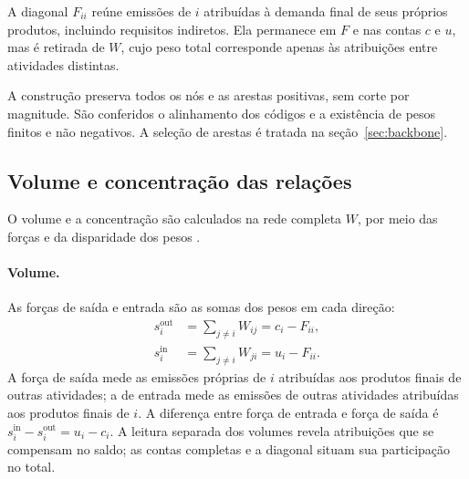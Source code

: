 \documentclass[12pt]{article}
\begin{document}
A diagonal $F_{ii}$ reúne emissões de $i$ atribuídas à demanda final de seus próprios produtos, incluindo requisitos indiretos. Ela permanece em $F$ e nas contas $c$ e $u$, mas é retirada de $W$, cujo peso total corresponde apenas às atribuições entre atividades distintas.

A construção preserva todos os nós e as arestas positivas, sem corte por magnitude. São conferidos o alinhamento dos códigos e a existência de pesos finitos e não negativos. A seleção de arestas é tratada na seção~\ref{sec:backbone}.

\subsection{Volume e concentração das relações}
\label{sec:volume-concentracao}

O volume e a concentração são calculados na rede completa $W$, por meio das forças e da disparidade dos pesos \parencite{huang2019,serrano2009}.

\paragraph{Volume.}
As forças de saída e entrada são as somas dos pesos em cada direção:
\begin{equation}
\begin{aligned}
s_i^{\mathrm{out}}&=\sum_{j\ne i}W_{ij}=c_i-F_{ii},\\
s_i^{\mathrm{in}}&=\sum_{j\ne i}W_{ji}=u_i-F_{ii}.
\end{aligned}
\label{eq:forcas-externas}
\end{equation}
A força de saída mede as emissões próprias de $i$ atribuídas aos produtos finais de outras atividades; a de entrada mede as emissões de outras atividades atribuídas aos produtos finais de $i$. A diferença entre força de entrada e força de saída é $s_i^{\mathrm{in}}-s_i^{\mathrm{out}}=u_i-c_i$. A leitura separada dos volumes revela atribuições que se compensam no saldo; as contas completas e a diagonal situam sua participação no total.
\end{document}
